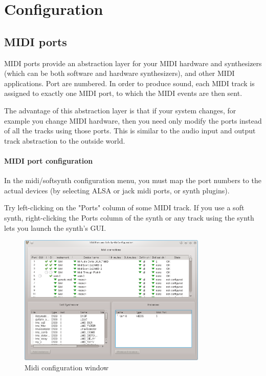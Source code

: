 \documentclass[a4paper]{report}
\newcommand{\screenshotwidth}[0]{0.8\textwidth}
\begin{document}
\section{Configuration}

\subsection{MIDI ports} 
MIDI ports provide an abstraction layer for your MIDI hardware and
synthesizers (which can be both software and hardware synthesizers),
and other MIDI applications. Port are numbered. In order to produce
sound, each MIDI track is assigned to exactly one MIDI port, to which
the MIDI events are then sent.

The advantage of this abstraction layer is that if your system changes,
for example you change MIDI hardware, then you need only modify the
ports instead of all the tracks using those ports. This is similar
to the audio input and output track abstraction to the outside world.

\label{midi_port_config} \paragraph{MIDI port configuration} 
In the midi/softsynth configuration menu, you must map the port numbers
to the actual devices (by selecting ALSA or jack midi ports, or synth
plugins).

Try left-clicking on the "Ports" column of some MIDI track.
If you use a soft synth, right-clicking the Ports column of the synth
or any track using the synth lets you launch the synth's GUI.

\begin{figure}[htp]
\centering \includegraphics[width=\screenshotwidth]
{pics/midi_config_window} 
\caption{Midi configuration window}
\label{fig:midi_config_window} 
\end{figure}
\end{document}
